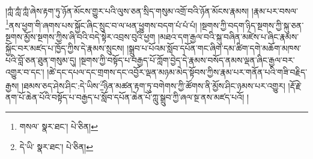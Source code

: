 །ཀླཾ་ཀླཾ་ཀླཾ་ཞེས་རྟག་ཏུ་ཉོན་མོངས་གྱུར་པའི་ལུས་ཅན་སྲིད་གསུམ་འགྲོ་བའི་ཉོན་མོངས་རྣམས། །རྣམ་པར་བསལ་\footnote{གསལ་  སྣར་ཐང་།  པེ་ཅིན། }ནས་ཕྱག་གི་ཞགས་པས་སྐྱོང་ཞིང་སྲུང་བ་ལ་ཕན་ཕྱུགས་བདག་པཾ་པཾ་པཾ། །སྔགས་ཀྱི་བདག་ཉིད་སྔགས་ཀྱི་སྐུ་ཅན་སྔགས་མྱོས་སྔགས་ཀྱིས་ཞི་བའི་བདེ་སྟེར་འབྲས་བུའི་ཕྱག །མཐའ་དག་རྒྱལ་བའི་སྐུ་བཞིན་མཛེས་པ་ཞིང་རྣམས་སྐྱོང་བར་མཛད་པ་ཁྱོད་ཀྱིས་དེ་རྣམས་སྲུངས། །སྒྲུབ་པ་པོའམ་སློབ་དཔོན་གང་ཞིག་དམ་ཚིག་དགེ་མཆོག་མཁས་པའི་བློ་ཅན་ཐུན་གསུམ་དུ། །སྔགས་ཀྱི་བསྟོད་པ་བརྒྱད་པོ་ཀློག་བྱེད་དེ་རྣམས་བསོད་ནམས་ལྡན་ཞིང་རྒྱལ་བར་འགྱུར་བ་དང་། །ཚེ་དང་དཔལ་དང་གྲགས་དང་འབྱོར་ལྡན་མཉམ་མེད་སྟོབས་ཀྱིས་རྣམ་པར་གནོན་པའི་གཟི་བརྗིད་རྒྱས། །ཐམས་ཅད་ཤེས་ཤིང་:དེ་ཡིས་\footnote{དེ་ཡི་  སྣར་ཐང་།  པེ་ཅིན། }ཉིན་མཚན་རྟག་ཏུ་བགེགས་ཀྱི་ཚོགས་ནི་མྱོས་ཤིང་ཉམས་པར་འགྱུར། །རྡོ་རྗེ་ནག་པོ་ཆེན་པོའི་བསྟོད་པ་བརྒྱད་པ་སློབ་དཔོན་ཆེན་པོ་ཀླུ་སྒྲུབ་ཀྱི་ཞལ་སྔ་ནས་མཛད་པའོ། ། 